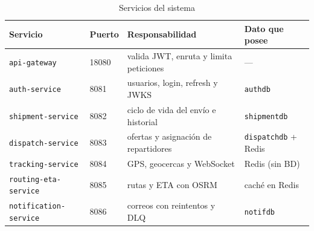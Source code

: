 \documentclass[10pt,letterpaper,twocolumn,oneside]{report}
\newcommand{\pkg}[1]{\texttt{#1}}
\begin{document}
\begin{table}[t]
\centering
\caption{Servicios del sistema}
\label{tab:servicios}
\small
\begin{tabular}{@{}L{2.6cm}L{1.2cm}L{5.6cm}L{4.2cm}@{}}
\toprule
\textbf{Servicio} & \textbf{Puerto} & \textbf{Responsabilidad} & \textbf{Dato que posee}\\
\midrule
\pkg{api-gateway} & 18080 & valida JWT, enruta y limita peticiones & —\\
\pkg{auth-service} & 8081 & usuarios, login, refresh y JWKS & \pkg{authdb}\\
\pkg{shipment-service} & 8082 & ciclo de vida del envío e historial & \pkg{shipmentdb}\\
\pkg{dispatch-service} & 8083 & ofertas y asignación de repartidores & \pkg{dispatchdb} + Redis\\
\pkg{tracking-service} & 8084 & GPS, geocercas y WebSocket & Redis (sin BD)\\
\pkg{routing-eta-service} & 8085 & rutas y ETA con OSRM & caché en Redis\\
\pkg{notification-service} & 8086 & correos con reintentos y DLQ & \pkg{notifdb}\\
\bottomrule
\end{tabular}
\end{table}
\end{document}
